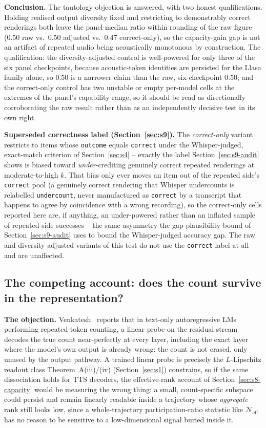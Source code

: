 \documentclass[11pt]{article}
\begin{document}
\textbf{Conclusion.} The tautology objection is answered, with two honest
qualifications. Holding realised output diversity fixed and restricting to
demonstrably correct renderings both leave the panel-median ratio within
rounding of the raw figure (0.50 raw vs.\ 0.50 adjusted
vs.\ 0.47 correct-only), so the capacity-gain gap is not an
artifact of repeated audio being acoustically monotonous by construction. The
qualification: the diversity-adjusted control is well-powered for only three
of the six panel checkpoints, because acoustic-token identities are persisted
for the Llasa family alone, so 0.50 is a narrower claim than the
raw, six-checkpoint 0.50; and the correct-only control has two
unstable or empty per-model cells at the extremes of the panel's capability
range, so it should be read as directionally corroborating the raw result
rather than as an independently decisive test in its own right.

\noindent\textbf{Superseded correctness label (Section~\ref{sec:s9}).} The
\emph{correct-only} variant restricts to items whose \texttt{outcome} equals
\texttt{correct} under the Whisper-judged, exact-match criterion of
Section~\ref{sec:s4} -- exactly the label Section~\ref{sec:s9-audit} shows is
biased toward \emph{under}-crediting genuinely correct repeated renderings at
moderate-to-high $k$. That bias only ever moves an item out of the repeated
side's \texttt{correct} pool (a genuinely correct rendering that Whisper
undercounts is relabelled \texttt{undercount}, never manufactured as
\texttt{correct} by a transcript that happens to agree by coincidence with a
wrong recording), so the correct-only cells reported here are, if anything,
an under-powered rather than an inflated sample of repeated-side successes --
the same asymmetry the gap-plausibility bound of Section~\ref{sec:s9-audit}
uses to bound the Whisper-judged accuracy gap. The raw and
diversity-adjusted variants of this test do not use the \texttt{correct}
label at all and are unaffected.

\subsection{The competing account: does the count survive in the representation?}
\label{sec:s8-probe}

\textbf{The objection.} Venkatesh~\cite{venkatesh2026repeated} reports that in
text-only autoregressive LMs performing repeated-token counting, a linear
probe on the residual stream decodes the true count near-perfectly at every
layer, including the exact layer where the model's own output is already
wrong: the count is not erased, only unused by the output pathway. A trained
linear probe is precisely the $L$-Lipschitz readout class
Theorem~A(iii)/(iv) (Section~\ref{sec:s1}) constrains, so if the same
dissociation holds for TTS decoders, the effective-rank account of
Section~\ref{sec:s8-capacity} would be measuring the wrong thing: a small, count-specific
subspace could persist and remain linearly readable inside a trajectory whose
\emph{aggregate} rank still looks low, since a whole-trajectory
participation-ratio statistic like $\mathcal{N}_{\mathrm{eff}}$ has no reason
to be sensitive to a low-dimensional signal buried inside it.
\end{document}
